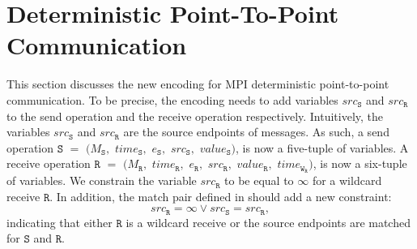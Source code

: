 \section{Deterministic Point-To-Point Communication}
This section discusses the new encoding for MPI deterministic point-to-point communication. To be precise, the encoding needs to add variables  $src_\mathtt{S}$ and $src_\mathtt{R}$ to the send operation and the receive operation respectively. Intuitively, the variables $src_\mathtt{S}$ and $src_\mathtt{R}$ are the source endpoints of messages. As such, a send operation $\mathtt{S}$ $=$ $(M_\mathtt{S},$ $\mathit{time}_\mathtt{S},$ $e_\mathtt{S},$ $src_\mathtt{S},$ $\mathit{value}_\mathtt{S})$,  is now a five-tuple of variables. A receive operation $\mathtt{R}$ $=$ $(M_\mathtt{R},$ $\mathit{time}_\mathtt{R},$ $e_\mathtt{R},$ $src_\mathtt{R},$ $\mathit{value}_\mathtt{R},$ $\mathit{time}_{\mathtt{W}_\mathtt{R}})$, is now a six-tuple of variables. We constrain the variable $src_\mathtt{R}$ to be equal to $\infty$ for a wildcard receive $\mathtt{R}$. In addition, the match pair defined in  should add a new constraint: 
\[
src_\mathtt{R} = \infty \vee src_\mathtt{S} = src_\mathtt{R}, 
\]
indicating that either $\mathtt{R}$ is a wildcard receive or the source endpoints are matched for $\mathtt{S}$ and $\mathtt{R}$.